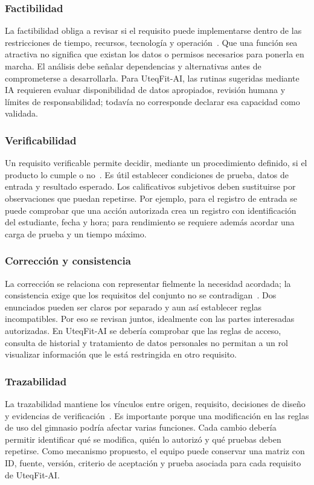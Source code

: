 \subsubsection{Factibilidad}
La factibilidad obliga a revisar si el requisito puede implementarse dentro de las restricciones de tiempo, recursos, tecnología y operación~\cite{ieee29148}. Que una función sea atractiva no significa que existan los datos o permisos necesarios para ponerla en marcha. El análisis debe señalar dependencias y alternativas antes de comprometerse a desarrollarla. Para UteqFit-AI, las rutinas sugeridas mediante IA requieren evaluar disponibilidad de datos apropiados, revisión humana y límites de responsabilidad; todavía no corresponde declarar esa capacidad como validada.

\subsubsection{Verificabilidad}
Un requisito verificable permite decidir, mediante un procedimiento definido, si el producto lo cumple o no~\cite{ieee29148}. Es útil establecer condiciones de prueba, datos de entrada y resultado esperado. Los calificativos subjetivos deben sustituirse por observaciones que puedan repetirse. Por ejemplo, para el registro de entrada se puede comprobar que una acción autorizada crea un registro con identificación del estudiante, fecha y hora; para rendimiento se requiere además acordar una carga de prueba y un tiempo máximo.

\subsubsection{Corrección y consistencia}
La corrección se relaciona con representar fielmente la necesidad acordada; la consistencia exige que los requisitos del conjunto no se contradigan~\cite{ieee29148}. Dos enunciados pueden ser claros por separado y aun así establecer reglas incompatibles. Por eso se revisan juntos, idealmente con las partes interesadas autorizadas. En UteqFit-AI se debería comprobar que las reglas de acceso, consulta de historial y tratamiento de datos personales no permitan a un rol visualizar información que le está restringida en otro requisito.

\subsubsection{Trazabilidad}
La trazabilidad mantiene los vínculos entre origen, requisito, decisiones de diseño y evidencias de verificación~\cite{ieee29148}. Es importante porque una modificación en las reglas de uso del gimnasio podría afectar varias funciones. Cada cambio debería permitir identificar qué se modifica, quién lo autorizó y qué pruebas deben repetirse. Como mecanismo propuesto, el equipo puede conservar una matriz con ID, fuente, versión, criterio de aceptación y prueba asociada para cada requisito de UteqFit-AI.

